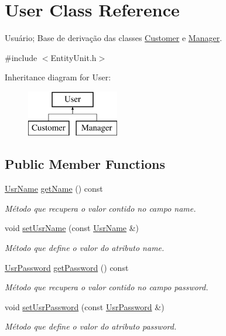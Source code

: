 \hypertarget{classUser}{\section{User Class Reference}
\label{d9/dc0/classUser}
}


Usuário; Base de derivação das classes \hyperlink{classCustomer}{Customer} e \hyperlink{classManager}{Manager}.  




{\ttfamily \#include $<$Entity\-Unit.\-h$>$}

Inheritance diagram for User\-:\begin{figure}[H]
\begin{center}
\leavevmode
\includegraphics[height=2.000000cm]{d9/dc0/classUser}
\end{center}
\end{figure}
\subsection*{Public Member Functions}
\begin{DoxyCompactItemize}
\item 
\hyperlink{classUsrName}{Usr\-Name} \hyperlink{classUser_ae1dd9bb1a02ea1aa4246da19c28cd831}{get\-Name} () const 
\begin{DoxyCompactList}\small\item\em Método que recupera o valor contido no campo name. \end{DoxyCompactList}\item 
void \hyperlink{classUser_ac20aab332b1debfd3b94aa4fb7825b07}{set\-Usr\-Name} (const \hyperlink{classUsrName}{Usr\-Name} \&)
\begin{DoxyCompactList}\small\item\em Método que define o valor do atributo name. \end{DoxyCompactList}\item 
\hyperlink{classUsrPassword}{Usr\-Password} \hyperlink{classUser_a799c61fc6ff206a1b1edbc86d61989ed}{get\-Password} () const 
\begin{DoxyCompactList}\small\item\em Método que recupera o valor contido no campo password. \end{DoxyCompactList}\item 
void \hyperlink{classUser_ad36ece3d4decfd7f3db7f15c96eec99b}{set\-Usr\-Password} (const \hyperlink{classUsrPassword}{Usr\-Password} \&)
\begin{DoxyCompactList}\small\item\em Método que define o valor do atributo password. \end{DoxyCompactList}\end{DoxyCompactItemize}
